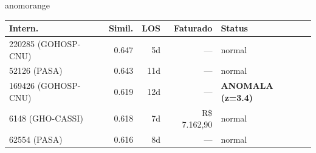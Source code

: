 \documentclass[a4paper,10pt]{article}
\begin{document}
\begin{anomalycard}[Internacao 162690 | GHO-PETROBRAS | ALTO (z=3.23)]{anomorange}
\begin{tabular}{l r r r l}\toprule\textbf{Intern.} & \textbf{Simil.} & \textbf{LOS} & \textbf{Faturado} & \textbf{Status} \\\midrule
220285 (GOHOSP-CNU) & 0.647 & 5d & --- & \textcolor{jcubeblue}{normal} \\
52126 (PASA) & 0.643 & 11d & --- & \textcolor{jcubeblue}{normal} \\
169426 (GOHOSP-CNU) & 0.619 & 12d & --- & \textcolor{anomred}{\textbf{ANOMALA (z=3.4)}} \\
6148 (GHO-CASSI) & 0.618 & 7d & R\$ 7.162,90 & \textcolor{jcubeblue}{normal} \\
62554 (PASA) & 0.616 & 8d & --- & \textcolor{jcubeblue}{normal} \\
\bottomrule\end{tabular}



\end{anomalycard}

\newpage
\end{document}
